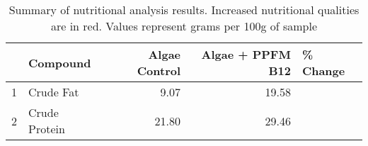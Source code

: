 \begin{table}[ht]
\centering
\begin{tabular}{rlrrl}
  \hline
 & Compound & Algae Control & Algae + PPFM B12 & \% Change \\ 
  \hline
1 & Crude Fat & 9.07 & 19.58 & \textbf{\color{red}{115.88}} \\ 
  2 & Crude Protein & 21.80 & 29.46 & \textbf{\color{red}{35.14}} \\ 
   \hline
\end{tabular}
\caption{Summary of nutritional analysis results. Increased nutritional qualities are in red. Values represent grams per 100g of sample} 
\label{tab:MiscTable_trim}
\end{table}
